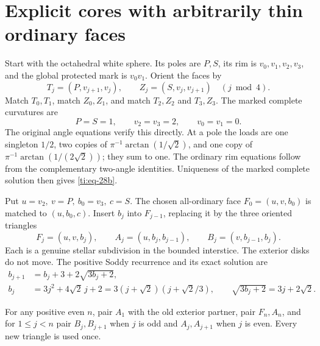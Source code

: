 \documentclass[11pt]{article}
\numberwithin{equation}{section}
\theoremstyle{definition}\newtheorem{definition}[theorem]{Definition}
\theoremstyle{remark}\newtheorem{remark}[theorem]{Remark}
\begin{document}
\section{Explicit cores with arbitrarily thin ordinary faces}\label{ti:sec-8}

Start with the octahedral white sphere. Its poles are \(P,S\), its rim is \(v_0,v_1,v_2,v_3\), and the global protected mark is \(v_0v_1\). Orient the faces by
\begin{equation}\label{ti:eq-28a}
T_j=(P,v_{j+1},v_j),\qquad Z_j=(S,v_j,v_{j+1})
\quad(j\bmod4).
\end{equation}
Match \(T_0,T_1\), match \(Z_0,Z_1\), and match \(T_2,Z_2\) and \(T_3,Z_3\). The marked complete curvatures are
\begin{equation}\label{ti:eq-28b}
P=S=1,\qquad v_2=v_3=2,\qquad v_0=v_1=0.
\end{equation}
The original angle equations verify this directly. At a pole the loads are one singleton \(1/2\), two copies of \(\pi^{-1}\arctan(1/\sqrt2)\), and one copy of \(\pi^{-1}\arctan(1/(2\sqrt2))\); they sum to one. The ordinary rim equations follow from the complementary two-angle identities. Uniqueness of the marked complete solution then gives \eqref{ti:eq-28b}.

Put \(u=v_2,\ v=P,\ b_0=v_3,\ c=S\). The chosen all-ordinary face \(F_0=(u,v,b_0)\) is matched to \((u,b_0,c)\). Insert \(b_j\) into \(F_{j-1}\), replacing it by the three oriented triangles
\begin{equation}\label{ti:eq-28c}
F_j=(u,v,b_j),\qquad A_j=(u,b_j,b_{j-1}),\qquad
B_j=(v,b_{j-1},b_j).
\end{equation}
Each is a genuine stellar subdivision in the bounded interstice. The exterior disks do not move. The positive Soddy recurrence and its exact solution are
\begin{equation}\label{ti:eq-28}
\begin{aligned}
b_{j+1}&=b_j+3+2\sqrt{3b_j+2},\\
b_j&=3j^2+4\sqrt2\,j+2
   =3(j+\sqrt2)(j+\sqrt2/3),\qquad
\sqrt{3b_j+2}=3j+2\sqrt2.
\end{aligned}
\end{equation}

For any positive even \(n\), pair \(A_1\) with the old exterior partner, pair \(F_n,A_n\), and for \(1\le j<n\) pair \(B_j,B_{j+1}\) when \(j\) is odd and \(A_j,A_{j+1}\) when \(j\) is even. Every new triangle is used once.
\end{document}
